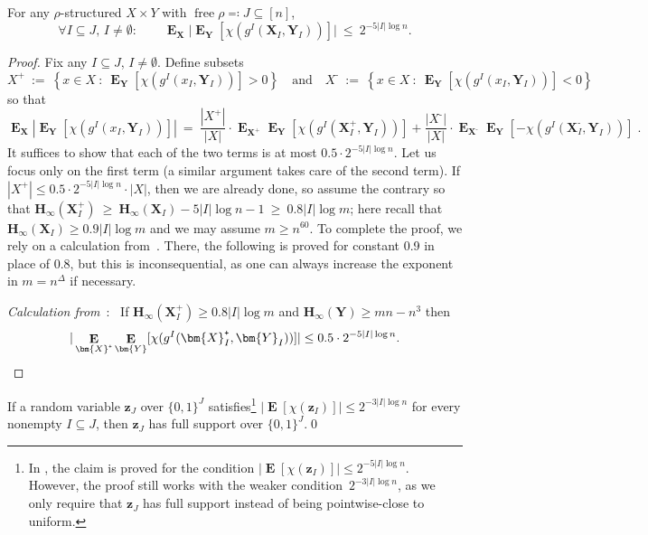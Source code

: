 \documentclass{toc}
\newcommand{\Hmin}{\mathbf{H}_\infty}
\DeclareMathOperator{\Ex}{\mathbf{E}}
\DeclareMathOperator{\free}{free}
\newcommand{\z}{\bm{z}}
\newcommand{\X}{\bm{X}}
\newcommand{\Y}{\bm{Y}}
\newcommand{\set}[1]{\left \{ #1 \right \}}
\newcommand{\bit}{\{0,1\}}
\begin{document}
\begin{claim} \label{prop:fourier-decay}
For any $\rho$-structured $X \times Y$ with $\free\rho \eqqcolon J \subseteq [n]$,
\[
\forall I\subseteq J,\,I\neq\emptyset:\qquad
\Ex_{\X} \big|\Ex_{\Y}[\chi(g^I(\X_I,\Y_I))]\big| ~\le~ 2^{-5 |I| \log n}.
\]
\end{claim}
\begin{proof}
Fix any $I \subseteq J$, $I\neq\emptyset$. Define subsets
\[
X^{\texttt{+}} ~:=~ \set{x \in X \ : \ \Ex_{\Y} [\chi(g^I(x_I,\Y_I))] > 0} \quad \text{and} \quad X^{\texttt{-}} ~:=~ \set{x \in X \ : \ \Ex_{\Y} [\chi(g^I(x_I,\Y_I))] < 0}
\]
so that
\[
\Ex_{\X} \left | \Ex_{\Y} [\chi(g^I(x_I,\Y_I))] \right |
~=~ \frac{|X^{\texttt{+}}|}{|X|} \cdot \Ex_{\X^{\texttt{+}}} \Ex_{\Y} [\chi(g^I(\X^{\texttt{+}}_I,\Y_I))] + \frac{|X^{\texttt{-}}|}{|X|} \cdot \Ex_{\X^{\texttt{-}}} \Ex_{\Y} [- \chi(g^I(\X^{\texttt{-}}_I,\Y_I))]\;.
\]
It suffices to show that each of the two terms is at most $0.5 \cdot 2^{- 5|I| \log n}$. Let us focus only on the first term (a similar argument takes care of the second term). If $|X^{\texttt{+}}| \le 0.5 \cdot 2^{- 5|I| \log n} \cdot |X|$, then we are already done, so assume the contrary so that $\Hmin(\X^{\texttt{+}}_I) ~\ge~ \Hmin(\X_I) - 5 |I| \log n - 1 ~\ge~ 0.8 |I| \log m$; here recall that $\Hmin(\X_I) \ge 0.9 |I| \log m$ and we may assume $m \geq n^{60}$. To complete the proof, we rely on a calculation from~\cite[Lem.~8]{goos17bpp}. There, the following is proved for constant 0.9 in place of 0.8, but this is inconsequential, as one can always increase the exponent in $m=n^\Delta$ if necessary.

\vspace{1mm}
\noindent \emph{Calculation from}~\cite[Lem.~8, Eq.~4]{goos17bpp}:~ If $\Hmin(\X^{\texttt{+}}_I) \ge 0.8 |I| \log m$ and $\Hmin(\Y) \ge mn - n^3$ then
\[
|\Ex_{\X^{\texttt{+}}} \Ex_{\Y} [\chi(g^I(\X^{\texttt{+}}_I,\Y_I))]| \le 0.5 \cdot 2^{-5|I| \log n}.\qedhere
\]
\end{proof}

\begin{claim} \label{prop:uniformity-from-fourier-decay}
If a random variable $\z_J$ over $\bit^J$ satisfies\footnote{In {\cite[\S4.6]{goos17bpp}}, the claim is proved for the condition $|\Ex [\chi(\z_I)]| \le 2^{-5|I| \log n}$. However, the proof still works with the weaker condition~$2^{-3|I| \log n}$, as we only require that $\z_J$ has full support instead of being pointwise-close to uniform.} $|\Ex [\chi(\z_I)]| \le 2^{-3|I| \log n}$ for every nonempty $I \subseteq J$, then $\z_J$ has full support over $\bit^J$.\qed
\end{claim}
\end{document}
